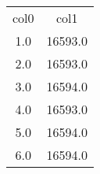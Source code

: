 \begin{table}
\begin{tabular}{cc}
col0 & col1 \\
1.0 & 16593.0 \\
2.0 & 16593.0 \\
3.0 & 16594.0 \\
4.0 & 16593.0 \\
5.0 & 16594.0 \\
6.0 & 16594.0 \\
\end{tabular}
\end{table}
